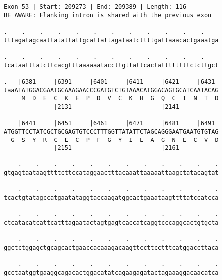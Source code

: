 \documentclass{article}
\begin{document}
\begin{Verbatim}
Exon 53 | Start: 209273 | End: 209389 | Length: 116
BE AWARE: Flanking intron is shared with the previous exon
 
.    .    .    .    .    .    .    .    .    .    .    .    
tttagatagcaattatattattgcattattagataatcttttgattaaacactgaaatga
  
.    .    .    .    .    .    .    .    .    .    .    .    
tcataatttatcttcacgtttaaaaaataccttgttattcactattttttttctcttgct
  
.   |6381     |6391     |6401     |6411     |6421     |6431 
taaATATGGACGAATGCAAAGAACCCGATGTCTGTAAACATGGACAGTGCATCAATACAG
     M  D  E  C  K  E  P  D  V  C  K  H  G  Q  C  I  N  T  D
              |2131                         |2141           
  
    |6441     |6451     |6461     |6471     |6481     |6491 
ATGGTTCCTATCGCTGCGAGTGTCCCTTTGGTTATATTCTAGCAGGGAATGAATGTGTAG
  G  S  Y  R  C  E  C  P  F  G  Y  I  L  A  G  N  E  C  V  D
              |2151                         |2161           
  
    .    .    .    .    .    .    .    .    .    .    .    .
gtgagtaataagttttcttccataggaactttacaaattaaaaattaagctatacagtat
  
    .    .    .    .    .    .    .    .    .    .    .    .
tcactgtatagccatgaatataggtaccaagatggcactgaaataagttttatccatcca
  
    .    .    .    .    .    .    .    .    .    .    .    .
ctcatacatcattcatttagaatactagtgagtcaccatcaggtcccaggcactgtgcta
  
    .    .    .    .    .    .    .    .    .    .    .    .
ggctctggagctgcagcactgaaccacaaagacaagttccttcctttcatggaccttaca
  
    .    .    .    .    .    .    .    .    .    .    .    .
gcctaatggtgaaggcagacactggacatatcagaagagatactagaaaggacaacatca
\end{Verbatim}
\newpage
\end{document}
